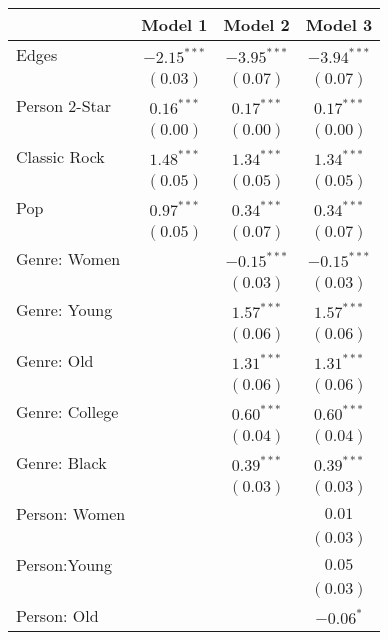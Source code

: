
\begin{table}
\begin{center}
\begin{tabular}{l c c c}
\toprule
 & Model 1 & Model 2 & Model 3 \\
\midrule
Edges          & $-2.15^{***}$ & $-3.95^{***}$ & $-3.94^{***}$ \\
               & $(0.03)$      & $(0.07)$      & $(0.07)$      \\
Person 2-Star  & $0.16^{***}$  & $0.17^{***}$  & $0.17^{***}$  \\
               & $(0.00)$      & $(0.00)$      & $(0.00)$      \\
Classic Rock   & $1.48^{***}$  & $1.34^{***}$  & $1.34^{***}$  \\
               & $(0.05)$      & $(0.05)$      & $(0.05)$      \\
Pop            & $0.97^{***}$  & $0.34^{***}$  & $0.34^{***}$  \\
               & $(0.05)$      & $(0.07)$      & $(0.07)$      \\
Genre: Women   &               & $-0.15^{***}$ & $-0.15^{***}$ \\
               &               & $(0.03)$      & $(0.03)$      \\
Genre: Young   &               & $1.57^{***}$  & $1.57^{***}$  \\
               &               & $(0.06)$      & $(0.06)$      \\
Genre: Old     &               & $1.31^{***}$  & $1.31^{***}$  \\
               &               & $(0.06)$      & $(0.06)$      \\
Genre: College &               & $0.60^{***}$  & $0.60^{***}$  \\
               &               & $(0.04)$      & $(0.04)$      \\
Genre: Black   &               & $0.39^{***}$  & $0.39^{***}$  \\
               &               & $(0.03)$      & $(0.03)$      \\
Person: Women  &               &               & $0.01$        \\
               &               &               & $(0.03)$      \\
Person:Young   &               &               & $0.05$        \\
               &               &               & $(0.03)$      \\
Person: Old    &               &               & $-0.06^{*}$   \\

\end{tabular}
\end{center}
\end{table}
